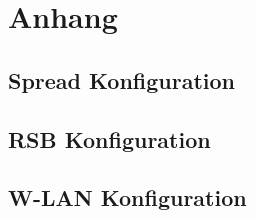 \chapter{Anhang}

\section{Spread Konfiguration}

\section{RSB Konfiguration}

\section{W-LAN Konfiguration}